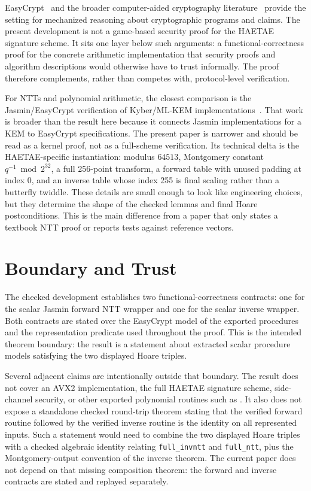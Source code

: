 \documentclass[10pt,twocolumn]{article}
\newcommand{\haetae}{HAETAE}
\newcommand{\ec}{EasyCrypt}
\newcommand{\jasmin}{Jasmin}
\begin{document}
\ec{}~\cite{EasyCrypt2013} and the broader computer-aided cryptography
literature~\cite{ComputerAidedCrypto2021} provide the setting for mechanized
reasoning about cryptographic programs and claims. The present development is
not a game-based security proof for the \haetae{} signature scheme. It sits one
layer below such arguments: a functional-correctness proof for the concrete
arithmetic implementation that security proofs and algorithm descriptions would
otherwise have to trust informally. The proof therefore complements, rather
than competes with, protocol-level verification.

For NTTs and polynomial arithmetic, the closest comparison is the
\jasmin{}/\ec{} verification of Kyber/ML-KEM
implementations~\cite{KyberVerify2023}. That work is broader than the result
here because it connects Jasmin implementations for a KEM to \ec{}
specifications. The present paper is narrower and should be read as a kernel
proof, not as a full-scheme verification. Its technical delta is the
HAETAE-specific instantiation: modulus \(64513\), Montgomery constant
\(q^{-1} \bmod 2^{32}\), a full 256-point transform, a forward table with unused
padding at index 0, and an inverse table whose index 255 is final scaling rather
than a butterfly twiddle. These details are small enough to look like
engineering choices, but they determine the shape of the checked lemmas and
final Hoare postconditions. This is the main difference from a paper that only
states a textbook NTT proof or reports tests against reference vectors.

\section{Boundary and Trust}

The checked development establishes two functional-correctness contracts: one
for the scalar \jasmin{} forward NTT wrapper and one for the scalar inverse
wrapper. Both contracts are stated over the \ec{} model of the exported
procedures and the representation predicate used throughout the proof. This is
the intended theorem boundary: the result is a statement about extracted scalar
procedure models satisfying the two displayed Hoare triples.

Several adjacent claims are intentionally outside that boundary. The result does
not cover an AVX2 implementation, the full \haetae{} signature scheme,
side-channel security, or other exported polynomial routines such as
. It also does not expose a standalone checked
round-trip theorem stating that the verified forward routine followed by the
verified inverse routine is the identity on all represented inputs. Such a
statement would need to combine the two displayed Hoare triples with a checked
algebraic identity relating \texttt{full\_invntt} and \texttt{full\_ntt}, plus
the Montgomery-output convention of the inverse theorem. The current paper does
not depend on that missing composition theorem: the forward and inverse
contracts are stated and replayed separately.
\end{document}
